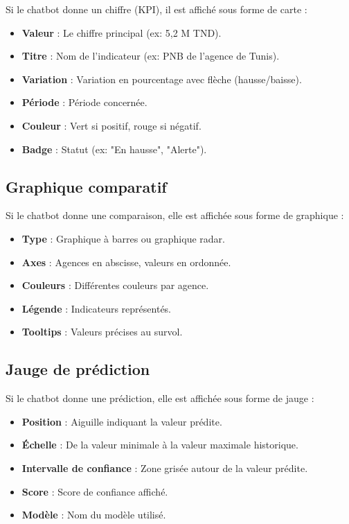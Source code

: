 Si le chatbot donne un chiffre (KPI), il est affiché sous forme de carte :

\begin{itemize}
    \item \textbf{Valeur} : Le chiffre principal (ex: 5,2 M TND).
    \item \textbf{Titre} : Nom de l'indicateur (ex: PNB de l'agence de Tunis).
    \item \textbf{Variation} : Variation en pourcentage avec flèche (hausse/baisse).
    \item \textbf{Période} : Période concernée.
    \item \textbf{Couleur} : Vert si positif, rouge si négatif.
    \item \textbf{Badge} : Statut (ex: "En hausse", "Alerte").
\end{itemize}

\subsection{Graphique comparatif}

Si le chatbot donne une comparaison, elle est affichée sous forme de graphique :

\begin{itemize}
    \item \textbf{Type} : Graphique à barres ou graphique radar.
    \item \textbf{Axes} : Agences en abscisse, valeurs en ordonnée.
    \item \textbf{Couleurs} : Différentes couleurs par agence.
    \item \textbf{Légende} : Indicateurs représentés.
    \item \textbf{Tooltips} : Valeurs précises au survol.
\end{itemize}

\subsection{Jauge de prédiction}

Si le chatbot donne une prédiction, elle est affichée sous forme de jauge :

\begin{itemize}
    \item \textbf{Position} : Aiguille indiquant la valeur prédite.
    \item \textbf{Échelle} : De la valeur minimale à la valeur maximale historique.
    \item \textbf{Intervalle de confiance} : Zone grisée autour de la valeur prédite.
    \item \textbf{Score} : Score de confiance affiché.
    \item \textbf{Modèle} : Nom du modèle utilisé.
\end{itemize}

